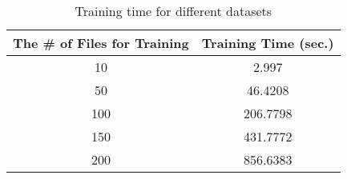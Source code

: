 \begin{table}[t]
\centering
\caption{Training time for different datasets}
\label{table-training}
\begin{tabular}{|c|c|}
\hline
{\bf The \# of Files for Training}       & {\bf Training Time (sec.)}  \\ 
\hline
\hline
10   & 2.997        \\ \hline
50   & 46.4208          \\ \hline
100  & 206.7798       \\ \hline
150  & 431.7772        \\ \hline
200  & 856.6383  \\ 
\hline
\end{tabular}
\end{table}


